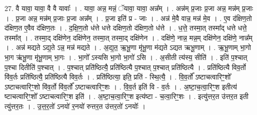 \documentclass[17pt]{extarticle}
\begin{document}
27. वै यावा॒ यावा॒ वै वै यावाः᳚ । . यावा॒ अन्न॒ मन्नं॒ ॅयावा॒ यावा॒ अन्न᳚म् । . अन्न॑म् प्र॒जाः प्र॒जा अन्न॒ मन्न॑म् प्र॒जाः । . प्र॒जा अन्न॒ मन्न॑म् प्र॒जाः प्र॒जा अन्न᳚म् । . प्र॒जा इति॑ प्र - जाः । . अन्न॑ मे॒वै वान्न॒ मन्न॑ मे॒व । . ए॒व द॑क्षिण॒तो द॑क्षिण॒त ए॒वैव द॑क्षिण॒तः । . द॒क्षि॒ण॒तो ध॑त्ते धत्ते दक्षिण॒तो द॑क्षिण॒तो ध॑त्ते । . ध॒त्ते॒ तस्मा॒त् तस्मा᳚द् धत्ते धत्ते॒ तस्मा᳚त् । . तस्मा॒द् दक्षि॑णेन॒ दक्षि॑णेन॒ तस्मा॒त् तस्मा॒द् दक्षि॑णेन । . दक्षि॑णे॒ नान्न॒ मन्न॒म् दक्षि॑णेन॒ दक्षि॑णे॒ नान्न᳚म् । . अन्न॑ मद्यते ऽद्य॒ते ऽन्न॒ मन्न॑ मद्यते । . अ॒द्य॒त॒ ऋ॒भू॒णा मृ॑भू॒णा म॑द्यते ऽद्यत ऋभू॒णाम् । . ऋ॒भू॒णाम् भा॒गो भा॒ग ऋ॑भू॒णा मृ॑भू॒णाम् भा॒गः । . भा॒गो᳚ ऽस्यसि भा॒गो भा॒गो॑ ऽसि । . अ॒सीती त्य॑स्य॒ सीति॑ । . इति॑ प॒श्चात् प॒श्चा दितीति॑ प॒श्चात् । . प॒श्चात् प्रति॑ष्ठित्यै॒ प्रति॑ष्ठित्यै प॒श्चात् प॒श्चात् प्रति॑ष्ठित्यै । . प्रति॑ष्ठित्यै विव॒र्तो वि॑व॒र्तः प्रति॑ष्ठित्यै॒ प्रति॑ष्ठित्यै विव॒र्तः । . प्रति॑ष्ठित्या॒ इति॒ प्रति॑ - स्थि॒त्यै॒ । . वि॒व॒र्तो᳚ ऽष्टाचत्वारिꣳ॒॒शो᳚ ऽष्टाचत्वारिꣳ॒॒शो वि॑व॒र्तो वि॑व॒र्तो᳚ ऽष्टाचत्वारिꣳ॒॒शः । . वि॒व॒र्त इति॑ वि - व॒र्तः । . अ॒ष्टा॒च॒त्वा॒रिꣳ॒॒श इतीत्य॑ ष्टाचत्वारिꣳ॒॒शो᳚ ऽष्टाचत्वारिꣳ॒॒श इति॑ । . अ॒ष्टा॒च॒त्वा॒रिꣳ॒॒श इत्य॑ष्टा - च॒त्वा॒रिꣳ॒॒शः । . इत्यु॑त्तर॒त उ॑त्तर॒त इती त्यु॑त्तर॒तः । . उ॒त्त॒र॒तो॑ ऽनयो॑ र॒नयो॑ रुत्तर॒त उ॑त्तर॒तो॑ ऽनयोः᳚ । \newline
\end{document}
